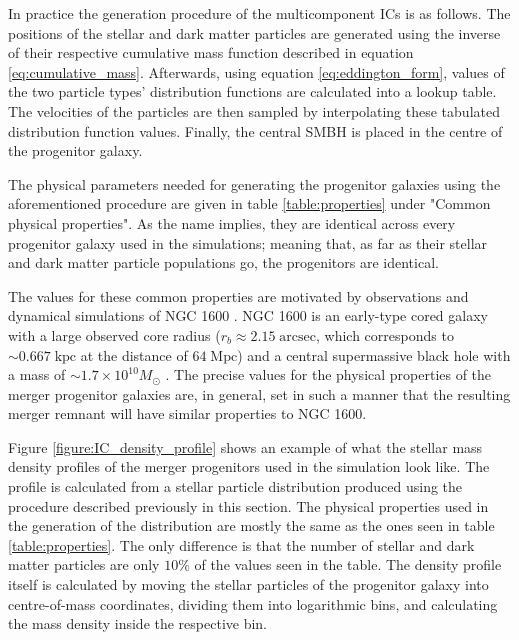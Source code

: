 \documentclass[english, oneside]{HYgradu}
\begin{document}
In practice the generation procedure of the multicomponent ICs is as follows. The positions of the stellar and dark matter particles are generated using the inverse of their respective cumulative mass function described in equation \ref{eq:cumulative_mass}. Afterwards, using equation \ref{eq:eddington_form}, values of the two particle types' distribution functions are calculated into a lookup table. The velocities of the particles are then sampled by interpolating these tabulated distribution function values. Finally, the central SMBH is placed in the centre of the progenitor galaxy.

The physical parameters needed for generating the progenitor galaxies using the aforementioned procedure are given in table \ref{table:properties} under "Common physical properties". As the name implies, they are identical across every progenitor galaxy used in the simulations; meaning that, as far as their stellar and dark matter particle populations go, the progenitors are identical. 

The values for these common properties are motivated by observations and dynamical simulations of NGC 1600 \citep{Rantala2018}. NGC 1600 is an early-type cored galaxy with a large observed core radius ($r_b \approx 2.15 \; \mathrm{arcsec}$, which corresponds to $\sim 0.667 \; \mathrm{kpc}$ at the distance of $64 \; \mathrm{Mpc}$) and a central supermassive black hole with a mass of $\sim 1.7 \times 10^{10} M_\odot$ \citep{Thomas2016}. The precise values for the physical properties of the merger progenitor galaxies are, in general, set in such a manner that the resulting merger remnant will have similar properties to NGC 1600.

Figure \ref{figure:IC_density_profile} shows an example of what the stellar mass density profiles of the merger progenitors used in the simulation look like. The profile is calculated from a stellar particle distribution produced using the procedure described previously in this section. The physical properties used in the generation of the distribution are mostly the same as the ones seen in table \ref{table:properties}. The only difference is that the number of stellar and dark matter particles are only $10 \%$  of the values seen in the table. The density profile itself is calculated by moving the stellar particles of the progenitor galaxy into centre-of-mass coordinates, dividing them into logarithmic bins, and calculating the mass density inside the respective bin.
\end{document}
